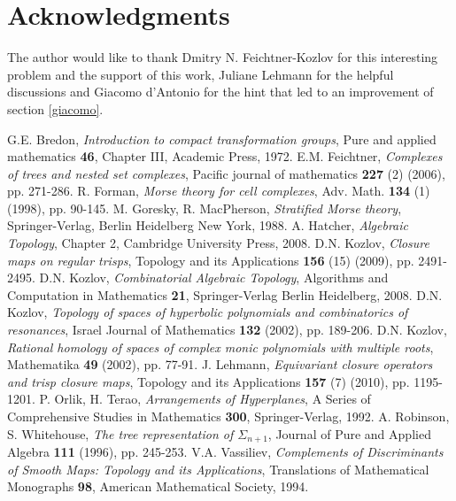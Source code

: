 \documentclass{elsarticle}
\begin{document}
\section*{Acknowledgments}
The author would like to thank Dmitry N. Feichtner-Kozlov for this interesting problem and the support of this work, Juliane Lehmann for the helpful discussions and Giacomo d'Antonio for the hint that led to an improvement of section \ref{giacomo}.

\begin{thebibliography}{00}
G.E. Bredon, \textit{Introduction to compact transformation groups}, Pure and applied mathematics \textbf{46}, Chapter III, Academic Press, 1972.
E.M. Feichtner, \textit{Complexes of trees and nested set complexes}, Pacific journal of mathematics \textbf{227} (2) (2006), pp. 271-286.
R. Forman, \textit{Morse theory for cell complexes}, Adv. Math. \textbf{134} (1) (1998), pp. 90-145.
M. Goresky, R. MacPherson, \textit{Stratified Morse theory}, Springer-Verlag, Berlin Heidelberg New York, 1988.
A. Hatcher, \textit{Algebraic Topology}, Chapter 2, Cambridge University Press, 2008.
D.N. Kozlov, \textit{Closure maps on regular trisps}, Topology and its Applications \textbf{156} (15) (2009), pp. 2491-2495.
D.N. Kozlov, \textit{Combinatorial Algebraic Topology}, Algorithms and Computation in Mathematics \textbf{21}, Springer-Verlag Berlin Heidelberg, 2008.
D.N. Kozlov, \textit{Topology of spaces of hyperbolic polynomials and combinatorics of resonances}, Israel Journal of Mathematics \textbf{132} (2002), pp. 189-206.
D.N. Kozlov, \textit{Rational homology of spaces of complex monic polynomials with multiple roots}, Mathematika  \textbf{49} (2002), pp. 77-91.
J. Lehmann, \textit{Equivariant closure operators and trisp closure maps}, Topology and its Applications \textbf{157} (7) (2010), pp. 1195-1201.
P. Orlik, H. Terao, \textit{Arrangements of Hyperplanes}, A Series of Comprehensive Studies in Mathematics \textbf{300}, Springer-Verlag, 1992.
A. Robinson, S. Whitehouse, \textit{The tree representation of $\Sigma_{n+1}$}, Journal of Pure and Applied Algebra \textbf{111} (1996), pp. 245-253.
V.A. Vassiliev, \textit{Complements of Discriminants of Smooth Maps: Topology and its Applications}, Translations of Mathematical Monographs \textbf{98}, American Mathematical Society, 1994.
\end{thebibliography}
\end{document}
